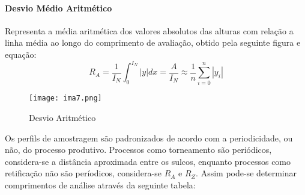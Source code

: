 \documentclass{article}
\begin{document}
            \paragraph{Desvio Médio Aritmético}Representa a média aritmética dos valores absolutos das alturas com relação a linha média ao longo do comprimento de avaliação, obtido pela seguinte figura e equação:
                \begin{equation}
                    \boxed{
                        R_{A} = 
                        \frac{1}{I_{N}} \int_{0}^{I_{N}} |y| dx = 
                        \frac{A}{I_{N}} \approx 
                        \frac{1}{n} \sum_{i=0}^{n} |y_{i}|
                    }
                \end{equation}
                \begin{figure}[H]
                    \centering
                    \texttt{[image: ima7.png]}
                    \caption{Desvio Aritmético}\label{fig:desvioA}
                \end{figure} \noindent
            Os perfils de amostragem são padronizados de acordo com a periodicidade, ou não, do processo produtivo. Processos como torneamento são periódicos, considera-se a distância aproximada entre os sulcos, enquanto processos como retificação não são períodicos, considera-se $R_{A}$ e $R_{Z}$. Assim pode-se determinar comprimentos de análise através da seguinte tabela:
\end{document}
